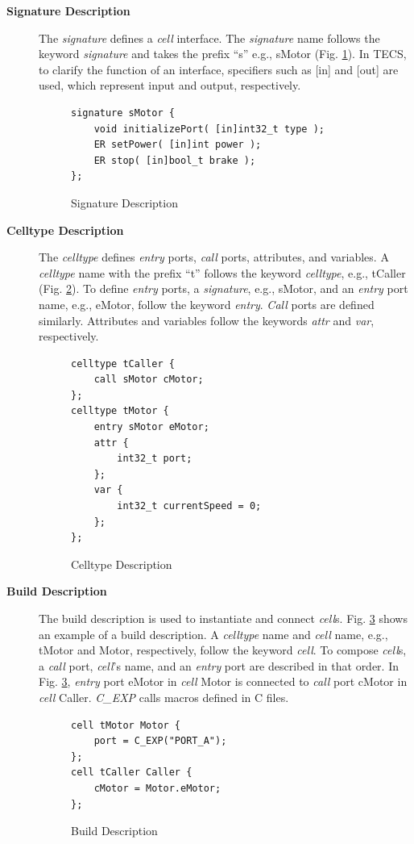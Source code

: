 \documentclass[a4j,12pt,oneside,openany,english]{jsbook}
\begin{document}
\begin{description}
    \item[{\bf Signature Description}]
        The {\it signature} defines a {\it cell} interface.
        The {\it signature} name follows the keyword {\it signature} and takes the prefix ``s'' e.g., sMotor (Fig. \ref{signature}).
        In TECS, to clarify the function of an interface, specifiers such as [in] and [out] are used, which represent input and output, respectively.
\begin{figure}[t]
\centering
\begin{lstlisting}
signature sMotor {
    void initializePort( [in]int32_t type );
    ER setPower( [in]int power );
    ER stop( [in]bool_t brake );
};
\end{lstlisting}
\caption{Signature Description}
\label{signature}
\end{figure}
    \item[{\bf Celltype Description}]
        The {\it celltype} defines {\it entry} ports, {\it call} ports, attributes, and variables.
        A {\it celltype} name with the prefix ``t'' follows the keyword {\it celltype}, e.g., tCaller (Fig. \ref{celltype}).
        To define {\it entry} ports, a {\it signature}, e.g., sMotor, and an {\it entry} port name, e.g., eMotor, follow the keyword {\it entry}.
        {\it Call} ports are defined similarly.
        Attributes and variables follow the keywords {\it attr} and {\it var}, respectively.
\begin{figure}[t]
\centering
\begin{lstlisting}
celltype tCaller {
    call sMotor cMotor;
};
celltype tMotor {
    entry sMotor eMotor;
    attr {
        int32_t port;
    };
    var {
        int32_t currentSpeed = 0;
    };
};
\end{lstlisting}
\caption{Celltype Description}
\label{celltype}
\end{figure}
    \item[{\bf Build Description}]
        The build description is used to instantiate and connect {\it cell}s.
        Fig. \ref{build} shows an example of a build description.
        A {\it celltype} name and {\it cell} name, e.g., tMotor and Motor, respectively, follow the keyword {\it cell}.
        To compose {\it cell}s, a {\it call} port, {\it cell}'s name, and an {\it entry} port are described in that order.
        In Fig. \ref{build}, {\it entry} port eMotor in {\it cell} Motor is connected to {\it call} port cMotor in {\it cell} Caller.
        {\it C\_EXP} calls macros defined in C files.

\begin{figure}[t]
\centering
\begin{lstlisting}
cell tMotor Motor {
    port = C_EXP("PORT_A");
};
cell tCaller Caller {
    cMotor = Motor.eMotor;
};
\end{lstlisting}
\caption{Build Description}
\label{build}
\end{figure}

\end{description}
\end{document}
